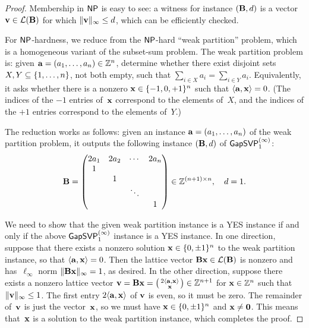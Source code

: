 \documentclass[11pt]{article}
\begin{document}
\begin{proof}
  Membership in $\mathsf{NP}$ is easy to see: a witness for instance
  $(\mathbf{B}, d)$ is a vector $\mathbf{v} \in \mathcal{L}(\mathbf{B})$ for which
  $\lVert\mathbf{v}\rVert_{\infty} \leq d$, which can be efficiently checked.
  
  For $\mathsf{NP}$-hardness, we reduce from the $\mathsf{NP}$-hard ``weak partition''
  problem, which is a homogeneous variant of the subset-sum problem.
  The weak partition problem is: given
  $\mathbf{a} = (a_1, \ldots, a_n) \in \mathbb{Z}^n$, determine whether there exist
  disjoint sets $X, Y \subseteq \{1, \ldots, n\}$, not both empty,
  such that $\sum_{i \in X} a_i = \sum_{i \in Y} a_i$. Equivalently,
  it asks whether there is a nonzero $\mathbf{x} \in \{-1, 0, +1\}^{n}$
  such that $\langle\mathbf{a}, \mathbf{x}\rangle = 0$. (The indices of the $-1$
  entries of~$\mathbf{x}$ correspond to the elements of~$X$, and the
  indices of the $+1$ entries correspond to the elements of~$Y$.)

  The reduction works as follows: given an instance
  $\mathbf{a} = (a_{1}, \ldots, a_{n})$ of the weak partition problem, it
  outputs the following instance $(\mathbf{B}, d)$ of
  $\mathsf{GapSVP}_{1}^{(\infty)}$:
  \[ \mathbf{B} =
    \begin{pmatrix}
      2a_1 & 2a_{2} & \cdots & 2a_n \\
      1 & &   &   \\
           & 1 & & \\
           & & \ddots &   \\
           & &  & 1 
    \end{pmatrix} \in \mathbb{Z}^{(n+1) \times n}, \quad d=1. \]

  We need to show that the given weak partition instance is a YES
  instance if and only if the above $\mathsf{GapSVP}_{1}^{(\infty)}$ instance
  is a YES instance. In one direction, suppose that there exists a
  nonzero solution $\mathbf{x} \in \{0, \pm 1\}^{n}$ to the weak
  partition instance, so that $\langle\mathbf{a}, \mathbf{x}\rangle = 0$. Then the
  lattice vector $\mathbf{B} \mathbf{x} \in \mathcal{L}(\mathbf{B})$ is nonzero and
  has~$\ell_{\infty}$ norm $\lVert\mathbf{B} \mathbf{x}\rVert_{\infty} = 1$, as
  desired. In the other direction, suppose there exists a nonzero
  lattice vector
  $\mathbf{v} = \mathbf{B} \mathbf{x} = \left(\begin{smallmatrix}2\langle\mathbf{a},\mathbf{x}\rangle \\ \mathbf{x}\end{smallmatrix}\right) \in
  \mathbb{Z}^{n+1}$ for $\mathbf{x} \in \mathbb{Z}^{n}$ such that
  $\lVert\mathbf{v}\rVert_{\infty} \leq 1$. The first entry
  $2\langle\mathbf{a},\mathbf{x}\rangle$ of $\mathbf{v}$ is even, so it must be zero. The
  remainder of~$\mathbf{v}$ is just the vector~$\mathbf{x}$, so we must have
  $\mathbf{x} \in \{0, \pm 1\}^{n}$ and $\mathbf{x} \neq \mathbf{0}$. This means
  that~$\mathbf{x}$ is a solution to the weak partition instance, which
  completes the proof.
\end{proof}
\end{document}
